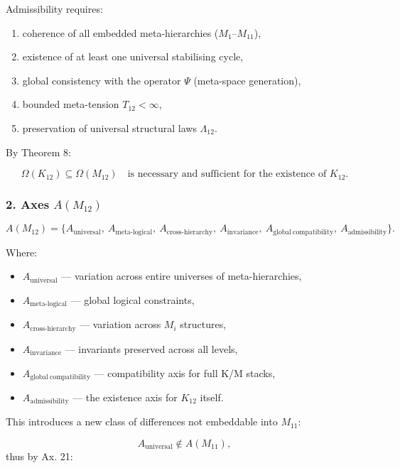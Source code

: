 Admissibility requires:

\begin{enumerate}
    \item coherence of all embedded meta-hierarchies (\(M_1\)–\(M_{11}\)),
    \item existence of at least one universal stabilising cycle,
    \item global consistency with the operator $\Psi$ (meta-space generation),
    \item bounded meta-tension $T_{12}<\infty$,
    \item preservation of universal structural laws $\Lambda_{12}$.
\end{enumerate}

By Theorem 8:

\[
\Omega(K_{12}) \subseteq \Omega(M_{12})
\quad \text{is necessary and sufficient for the existence of }K_{12}.
\]

\subsubsection*{2. Axes $A(M_{12})$}

\[
A(M_{12}) =
\{
A_{\mathrm{universal}},\
A_{\mathrm{meta\mbox{-}logical}},\
A_{\mathrm{cross\mbox{-}hierarchy}},\
A_{\mathrm{invariance}},\
A_{\mathrm{global\ compatibility}},\
A_{\mathrm{admissibility}}
\}.
\]

Where:

\begin{itemize}
    \item $A_{\mathrm{universal}}$ — variation across entire universes of meta-hierarchies,
    \item $A_{\mathrm{meta\mbox{-}logical}}$ — global logical constraints,
    \item $A_{\mathrm{cross\mbox{-}hierarchy}}$ — variation across $M_i$ structures,
    \item $A_{\mathrm{invariance}}$ — invariants preserved across all levels,
    \item $A_{\mathrm{global\ compatibility}}$ — compatibility axis for full K/M stacks,
    \item $A_{\mathrm{admissibility}}$ — the existence axis for $K_{12}$ itself.
\end{itemize}

This introduces a new class of differences not embeddable into $M_{11}$:

\[
A_{\mathrm{universal}}\notin A(M_{11}),
\]
thus by Ax. 21:

